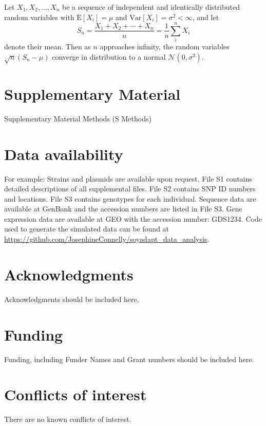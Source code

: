 \documentclass[9pt, onecolumn,twoside]{gsajnl}
\begin{document}
Let $X_1, X_2, \ldots, X_n$ be a sequence of independent and identically distributed random variables with $\text{E}[X_i] = \mu$ and $\text{Var}[X_i] = \sigma^2 < \infty$, and let
\begin{equation}
S_n = \frac{X_1 + X_2 + \cdots + X_n}{n}
      = \frac{1}{n}\sum_{i}^{n} X_i
\label{eq:refname1}
\end{equation}
denote their mean. Then as $n$ approaches infinity, the random variables $\sqrt{n}(S_n - \mu)$ converge in distribution to a normal $\mathcal{N}(0, \sigma^2)$.

\section{Supplementary Material}
\label{sec:supplementary:material}
Supplementary Material Methods (S Methods)

\section{Data availability}

For example: Strains and plasmids are available upon request. File S1 contains detailed descriptions of all supplemental files. File S2 contains SNP ID numbers and locations. File S3 contains genotypes for each individual. Sequence data are available at GenBank and the accession numbers are listed in File S3. Gene expression data are available at GEO with the accession number: GDS1234. Code used to generate the simulated data can be found at \url{https://github.com/JosephineConnelly/soyadapt_data_analysis}.

\section{Acknowledgments}
Acknowledgments should be included here.

\section{Funding}
Funding, including Funder Names and Grant numbers should be included here.

\section{Conflicts of interest}
There are  no known conflicts of interest.


\end{document}
